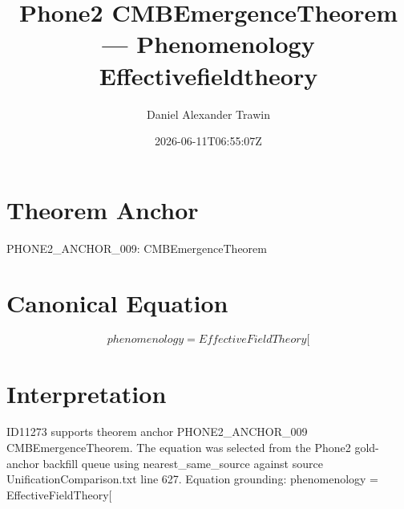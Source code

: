 \documentclass[11pt]{article}
\title{Phone2 CMBEmergenceTheorem — Phenomenology Effectivefieldtheory}
\author{Daniel Alexander Trawin}
\date{2026-06-11T06:55:07Z}
\begin{document}
\maketitle
\section*{Theorem Anchor}
PHONE2_ANCHOR_009: CMBEmergenceTheorem
\section*{Canonical Equation}
\[
phenomenology = EffectiveFieldTheory[
\]
\section*{Interpretation}
ID11273 supports theorem anchor PHONE2_ANCHOR_009 CMBEmergenceTheorem. The equation was selected from the Phone2 gold-anchor backfill queue using nearest_same_source against source UnificationComparison.txt line 627. Equation grounding: phenomenology = EffectiveFieldTheory[
\end{document}
